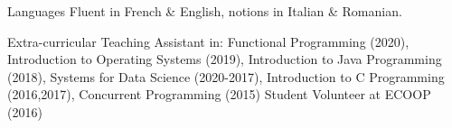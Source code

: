 


\begin{cvskills}


\cvskill
{Languages} %
{Fluent in French \& English, notions in Italian \& Romanian.} %

\cvskill
{Extra-curricular} %
{
  Teaching Assistant in: Functional Programming (2020), Introduction to Operating Systems (2019), Introduction to Java Programming (2018), Systems for Data Science (2020-2017), Introduction to C Programming (2016,2017), Concurrent Programming (2015)
	Student Volunteer at ECOOP (2016)
}


\end{cvskills}
